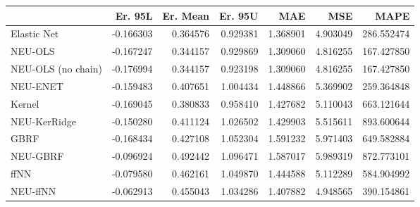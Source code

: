\begin{tabular}{lrrrrrr}
\toprule
{} &   Er. 95L &  Er. Mean &   Er. 95U &       MAE &       MSE &        MAPE \\
\midrule
Elastic Net        & -0.166303 &  0.364576 &  0.929381 &  1.368901 &  4.903049 &  286.552474 \\
NEU-OLS            & -0.167247 &  0.344157 &  0.929869 &  1.309060 &  4.816255 &  167.427850 \\
NEU-OLS (no chain) & -0.176994 &  0.344157 &  0.923198 &  1.309060 &  4.816255 &  167.427850 \\
NEU-ENET           & -0.159483 &  0.407651 &  1.004434 &  1.448866 &  5.369902 &  259.364848 \\
Kernel             & -0.169045 &  0.380833 &  0.958410 &  1.427682 &  5.110043 &  663.121644 \\
NEU-KerRidge       & -0.150280 &  0.411124 &  1.026502 &  1.429903 &  5.515611 &  893.600644 \\
GBRF               & -0.168434 &  0.427108 &  1.052304 &  1.591232 &  5.971403 &  649.582884 \\
NEU-GBRF           & -0.096924 &  0.492442 &  1.096471 &  1.587017 &  5.989319 &  872.773101 \\
ffNN               & -0.079580 &  0.462161 &  1.049870 &  1.444588 &  5.112289 &  584.904992 \\
NEU-ffNN           & -0.062913 &  0.455043 &  1.034286 &  1.407882 &  4.948565 &  390.154861 \\
\bottomrule
\end{tabular}
